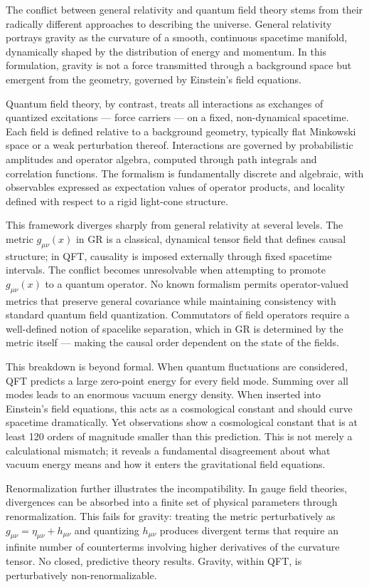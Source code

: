 The conflict between general relativity and quantum field theory stems from their radically different approaches to describing the universe. General relativity portrays gravity as the curvature of a smooth, continuous spacetime manifold, dynamically shaped by the distribution of energy and momentum. In this formulation, gravity is not a force transmitted through a background space but emergent from the geometry, governed by Einstein’s field equations.

Quantum field theory, by contrast, treats all interactions as exchanges of quantized excitations — force carriers — on a fixed, non-dynamical spacetime. Each field is defined relative to a background geometry, typically flat Minkowski space or a weak perturbation thereof. Interactions are governed by probabilistic amplitudes and operator algebra, computed through path integrals and correlation functions. The formalism is fundamentally discrete and algebraic, with observables expressed as expectation values of operator products, and locality defined with respect to a rigid light-cone structure.

This framework diverges sharply from general relativity at several levels. The metric $g_{\mu\nu}(x)$ in GR is a classical, dynamical tensor field that defines causal structure; in QFT, causality is imposed externally through fixed spacetime intervals. The conflict becomes unresolvable when attempting to promote $g_{\mu\nu}(x)$ to a quantum operator. No known formalism permits operator-valued metrics that preserve general covariance while maintaining consistency with standard quantum field quantization. Commutators of field operators require a well-defined notion of spacelike separation, which in GR is determined by the metric itself — making the causal order dependent on the state of the fields.

This breakdown is beyond formal. When quantum fluctuations are considered, QFT predicts a large zero-point energy for every field mode. Summing over all modes leads to an enormous vacuum energy density. When inserted into Einstein’s field equations, this acts as a cosmological constant and should curve spacetime dramatically. Yet observations show a cosmological constant that is at least 120 orders of magnitude smaller than this prediction. This is not merely a calculational mismatch; it reveals a fundamental disagreement about what vacuum energy means and how it enters the gravitational field equations.

Renormalization further illustrates the incompatibility. In gauge field theories, divergences can be absorbed into a finite set of physical parameters through renormalization. This fails for gravity: treating the metric perturbatively as $g_{\mu\nu} = \eta_{\mu\nu} + h_{\mu\nu}$ and quantizing $h_{\mu\nu}$ produces divergent terms that require an infinite number of counterterms involving higher derivatives of the curvature tensor. No closed, predictive theory results. Gravity, within QFT, is perturbatively non-renormalizable.


